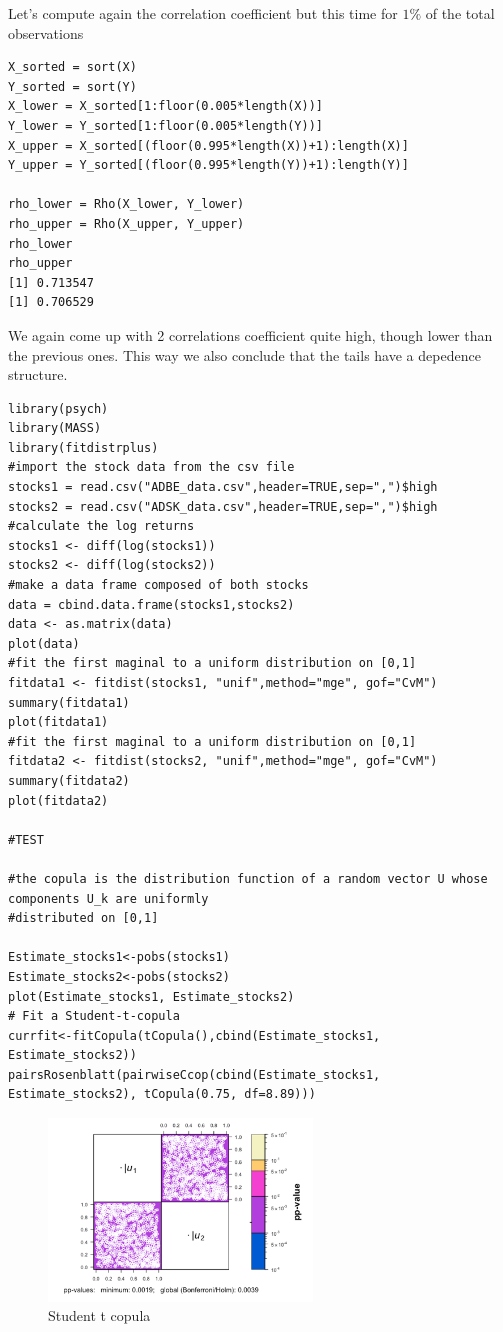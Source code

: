 \documentclass[11pt]{article}
\begin{document}
Let's compute again the correlation coefficient but this time for $1\%$ of the total observations

\begin{lstlisting}
X_sorted = sort(X)
Y_sorted = sort(Y)
X_lower = X_sorted[1:floor(0.005*length(X))]
Y_lower = Y_sorted[1:floor(0.005*length(Y))]
X_upper = X_sorted[(floor(0.995*length(X))+1):length(X)]
Y_upper = Y_sorted[(floor(0.995*length(Y))+1):length(Y)]

rho_lower = Rho(X_lower, Y_lower)
rho_upper = Rho(X_upper, Y_upper)
rho_lower
rho_upper
[1] 0.713547
[1] 0.706529
\end{lstlisting}
We again come up with 2 correlations coefficient quite high, though lower than the previous ones. This way we also conclude that the tails have a depedence structure.


\begin{lstlisting}
library(psych)
library(MASS)
library(fitdistrplus)
#import the stock data from the csv file
stocks1 = read.csv("ADBE_data.csv",header=TRUE,sep=",")$high
stocks2 = read.csv("ADSK_data.csv",header=TRUE,sep=",")$high
#calculate the log returns
stocks1 <- diff(log(stocks1))
stocks2 <- diff(log(stocks2))
#make a data frame composed of both stocks
data = cbind.data.frame(stocks1,stocks2)
data <- as.matrix(data)
plot(data)
#fit the first maginal to a uniform distribution on [0,1]
fitdata1 <- fitdist(stocks1, "unif",method="mge", gof="CvM")
summary(fitdata1)
plot(fitdata1)
#fit the first maginal to a uniform distribution on [0,1]
fitdata2 <- fitdist(stocks2, "unif",method="mge", gof="CvM")
summary(fitdata2)
plot(fitdata2)

#TEST

#the copula is the distribution function of a random vector U whose components U_k are uniformly
#distributed on [0,1] 

Estimate_stocks1<-pobs(stocks1)
Estimate_stocks2<-pobs(stocks2)
plot(Estimate_stocks1, Estimate_stocks2)
# Fit a Student-t-copula
currfit<-fitCopula(tCopula(),cbind(Estimate_stocks1, Estimate_stocks2))
pairsRosenblatt(pairwiseCcop(cbind(Estimate_stocks1, Estimate_stocks2), tCopula(0.75, df=8.89)))
\end{lstlisting}
\begin{figure}[!ht]
 \center
  \includegraphics[width=70mm]{Student_t}
  \caption{Student t copula}
  \label{fig:plot data}
\end{figure}
\end{document}
